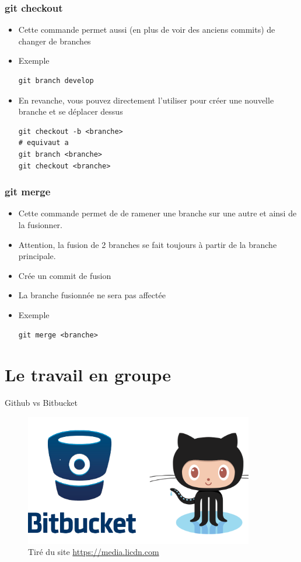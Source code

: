 \documentclass{beamer}
\begin{document}
\begin{frame}[fragile]
\frametitle{git checkout}

\begin{itemize}
\item Cette commande permet aussi (en plus de voir des anciens commits) de changer de branches
\item Exemple
\begin{lstlisting}
git branch develop
\end{lstlisting}
\item  En revanche, vous pouvez directement l'utiliser pour créer une nouvelle branche et se déplacer dessus
\begin{lstlisting}
git checkout -b <branche> 
# equivaut a 
git branch <branche>
git checkout <branche>
\end{lstlisting}
\end{itemize}
\end{frame}

\begin{frame}[fragile]
\frametitle{git merge}

\begin{itemize}
\item Cette commande permet de de ramener une branche sur une autre et ainsi de la fusionner. 
\item Attention, la fusion de 2 branches se fait toujours à partir de la branche principale.
\item Crée un commit de fusion
\item La branche fusionnée ne sera pas affectée
\item Exemple
\begin{lstlisting}
git merge <branche>
\end{lstlisting}
\end{itemize}
\end{frame}

\section{Le travail en groupe}

\begin{frame}{Github vs Bitbucket}
\begin{figure}
    \centering
    \includegraphics[width=10cm]{img/github-bitbucket.png}
    \caption{Tiré du site \url{https://media.licdn.com}}
\end{figure}
\end{frame}
\end{document}

